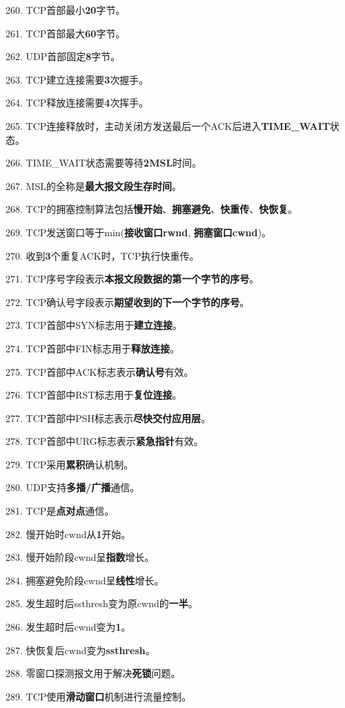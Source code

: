 \documentclass[12pt,a4paper,openany]{ctexbook}
\begin{document}
260. TCP首部最小\textbf{20}字节。

261. TCP首部最大\textbf{60}字节。

262. UDP首部固定\textbf{8}字节。

263. TCP建立连接需要\textbf{3}次握手。

264. TCP释放连接需要\textbf{4}次挥手。

265. TCP连接释放时，主动关闭方发送最后一个ACK后进入\textbf{TIME\_WAIT}状态。

266. TIME\_WAIT状态需要等待\textbf{2MSL}时间。

267. MSL的全称是\textbf{最大报文段生存时间}。

268. TCP的拥塞控制算法包括\textbf{慢开始}、\textbf{拥塞避免}、\textbf{快重传}、\textbf{快恢复}。

269. TCP发送窗口等于min(\textbf{接收窗口rwnd}, \textbf{拥塞窗口cwnd})。

270. 收到\textbf{3}个重复ACK时，TCP执行快重传。

271. TCP序号字段表示\textbf{本报文段数据的第一个字节的序号}。

272. TCP确认号字段表示\textbf{期望收到的下一个字节的序号}。

273. TCP首部中SYN标志用于\textbf{建立连接}。

274. TCP首部中FIN标志用于\textbf{释放连接}。

275. TCP首部中ACK标志表示\textbf{确认号}有效。

276. TCP首部中RST标志用于\textbf{复位连接}。

277. TCP首部中PSH标志表示\textbf{尽快交付应用层}。

278. TCP首部中URG标志表示\textbf{紧急指针}有效。

279. TCP采用\textbf{累积}确认机制。

280. UDP支持\textbf{多播/广播}通信。

281. TCP是\textbf{点对点}通信。

282. 慢开始时cwnd从\textbf{1}开始。

283. 慢开始阶段cwnd呈\textbf{指数}增长。

284. 拥塞避免阶段cwnd呈\textbf{线性}增长。

285. 发生超时后ssthresh变为原cwnd的\textbf{一半}。

286. 发生超时后cwnd变为\textbf{1}。

287. 快恢复后cwnd变为\textbf{ssthresh}。

288. 零窗口探测报文用于解决\textbf{死锁}问题。

289. TCP使用\textbf{滑动窗口}机制进行流量控制。
\end{document}
